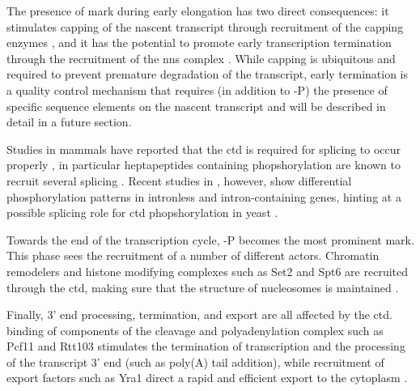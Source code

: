 The presence of \serf{} mark during early elongation has two direct consequences: it stimulates capping of the nascent transcript through recruitment of the capping enzymes \cite{mccracken:1997:5capping}, and it has the potential to promote early transcription termination through the recruitment of the \gls{nns} complex  \cite{vasiljeva:2008:nrd1nab3sen1}.
While capping is ubiquitous and required to prevent premature degradation of the transcript, early termination is a quality control mechanism that requires (in addition to \serf{}-P) the presence of specific sequence elements on the nascent transcript and will be described in detail in a future section.

Studies in mammals have reported that the \gls{ctd} is required for splicing to occur properly  \cite{mccracken:1997:cterminal}, in particular heptapeptides containing \sert{} phopshorylation are known to recruit several splicing \cite{gu:2013:ctd}. Recent studies in \cer{}, however, show differential phosphorylation patterns in intronless and intron-containing genes, hinting at a possible splicing role for \gls{ctd} phopshorylation in yeast \cite{milligan:2016:strandspecific}.

Towards the end of the transcription cycle, \sert{}-P becomes the most prominent mark. 
This phase sees the recruitment of a number of different actors.
Chromatin remodelers and histone modifying complexes such as Set2 and Spt6 are recruited through the \gls{ctd}, making sure that the structure of nucleosomes is maintained \cite{burugula:2014:histone}.

Finally, 3' end processing, termination, and export are all affected by the \gls{ctd}. binding of components of the cleavage and polyadenylation complex such as Pcf11 and Rtt103 stimulates the termination of transcription and the processing of the transcript 3' end (such as poly(A) tail addition), while recruitment of export factors such as Yra1 direct a rapid and efficient export to the cytoplasm \cite{mackellar:2011:cotranscriptional}.
 


\clearpage